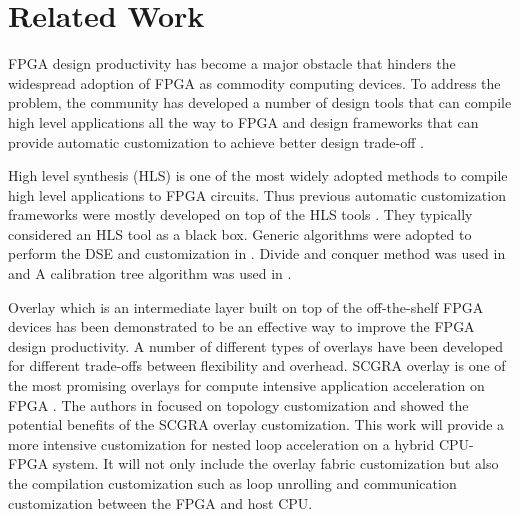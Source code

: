 \section{Related Work} \label{sec:relatedwork}
FPGA design productivity has become a major obstacle that hinders the 
widespread adoption of FPGA as commodity computing devices. To address 
the problem, the community has developed a number of design tools that 
can compile high level applications all the way to FPGA 
\cite{zhang2008autopilot, Legup, VivadoHLS, ROCCC} and design 
frameworks that can provide automatic customization to achieve better 
design trade-off \cite{dataflowcustomization, 
mlcustomization, genericcustomization, DCcustomization, onlinecustomization, 
RCcustomization, colinheart}.

High level synthesis (HLS) is one of the most widely adopted methods to 
compile high level applications to FPGA circuits. Thus previous automatic 
customization frameworks were mostly developed on top of the HLS tools 
\cite{dataflowcustomization, mlcustomization, 
genericcustomization, DCcustomization, onlinecustomization}. 
They typically considered an HLS tool as a black box. Generic algorithms 
were adopted to perform the DSE and customization in
\cite{mlcustomization, genericcustomization, onlinecustomization}. 
Divide and conquer method was used in \cite{DCcustomization} and 
A calibration tree algorithm was used in \cite{RCcustomization}.  

Overlay which is an intermediate layer built on top of the 
off-the-shelf FPGA devices has been demonstrated to be an 
effective way to improve the FPGA design productivity\cite{scgra, ferreira2011fpga}. 
A number of different types of overlays \cite{Lebedev2010, kissler2006dynamically, 
    ferreira2011fpga, Grant2011Malibu, Guppy2012GPU-Like, unnikrishnan2009application, 
Yiannacouras2009FPS, Capalija2009coarse-grain} have been developed for different 
trade-offs between flexibility and overhead. SCGRA overlay is one of the most 
promising overlays for compute intensive application acceleration on FPGA 
\cite{scgra, colinheart}. The authors in \cite{colinheart} focused
on topology customization and showed the potential benefits of the SCGRA overlay 
customization. This work will provide a more intensive customization for nested loop
acceleration on a hybrid CPU-FPGA system. It will not only include the overlay 
fabric customization but also the compilation customization such as loop unrolling 
and communication customization between the FPGA and host CPU.

